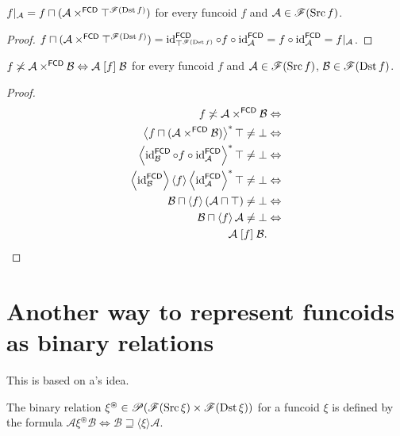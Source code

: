 \begin{cor}
$f|_{\mathcal{A}}=f\sqcap(\mathcal{A}\times^{\mathsf{FCD}}\top^{\mathscr{F}(\operatorname{Dst}
f)})$
for every funcoid $f$ and $\mathcal{A}\in\mathscr{F}(\operatorname{Src} f)$.\end{cor}
\begin{proof}
$f\sqcap(\mathcal{A}\times^{\mathsf{FCD}}\top^{\mathscr{F}(\operatorname{Dst}
f)})=\operatorname{id}_{\top^{\mathscr{F}(\operatorname{Dst} f)}}^{\mathsf{FCD}}\circ
f\circ\operatorname{id}_{\mathcal{A}}^{\mathsf{FCD}}=f\circ\operatorname{id}_{\mathcal{A}}^{\mathsf{FCD}}
=f|_{\mathcal{A}}$.\end{proof}
\begin{cor}\label{pintrs-fcd}
$f\not\asymp\mathcal{A}\times^{\mathsf{FCD}}\mathcal{B}\Leftrightarrow\mathcal{A}
\mathrel{\left[f\right]}\mathcal{B}$
for every funcoid $f$ and $\mathcal{A}\in\mathscr{F}(\operatorname{Src} f)$,
$\mathcal{B}\in\mathscr{F}(\operatorname{Dst} f)$.\end{cor}
\begin{proof}
~
\begin{align*}
f\not\asymp\mathcal{A}\times^{\mathsf{FCD}}\mathcal{B} & \Leftrightarrow\\
\left\langle f\sqcap(\mathcal{A}\times^{\mathsf{FCD}}\mathcal{B})\right\rangle ^{\ast}\top\ne\bot & \Leftrightarrow\\
\left\langle \operatorname{id}_{\mathcal{B}}^{\mathsf{FCD}}\circ
f\circ\operatorname{id}_{\mathcal{A}}^{\mathsf{FCD}}\right\rangle ^{\ast}\top\ne\bot & \Leftrightarrow\\
\left\langle \operatorname{id}_{\mathcal{B}}^{\mathsf{FCD}}\right\rangle\left\langle f\right\rangle\left\langle \operatorname{id}_{\mathcal{A}}^{\mathsf{FCD}}\right\rangle ^{\ast}\top\ne\bot & \Leftrightarrow\\
\mathcal{B}\sqcap\left\langle f\right\rangle(\mathcal{A}\sqcap\top)\ne\bot & \Leftrightarrow\\
\mathcal{B}\sqcap\left\langle f\right\rangle\mathcal{A}\ne\bot &
\Leftrightarrow\\
\mathcal{A}\mathrel{\left[f\right]}\mathcal{B}.
\end{align*}
\end{proof}

\section{\label{fcd-rel-another}Another way to represent funcoids as binary
relations}

This is based on a's idea.
\begin{defn}
The binary relation
$\xi^{\circledast}\in\mathscr{P}(\mathscr{F}(\operatorname{Src}\xi)\times\mathscr{F}(\operatorname{Dst}\xi))$
for a funcoid $\xi$ is defined by the formula
$\mathcal{A}\mathrel{\xi^{\circledast}}\mathcal{B}\Leftrightarrow\mathcal{B}
\sqsupseteq\langle\xi\rangle\mathcal{A}$.
\end{defn}


